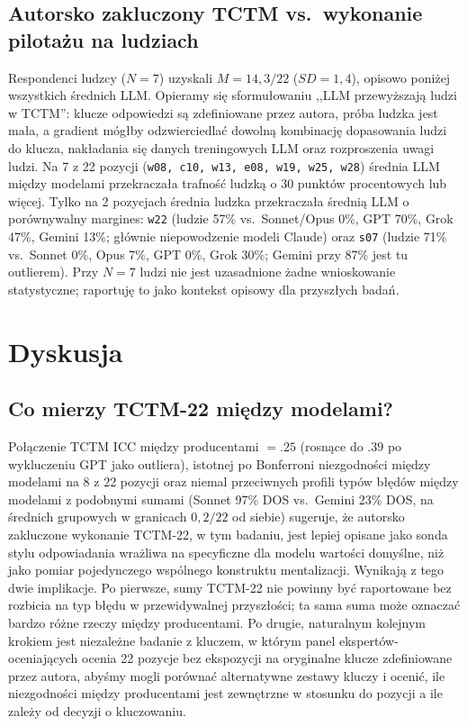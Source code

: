\documentclass[11pt,a4paper]{article}
\begin{document}
\subsection{Autorsko zakluczony TCTM vs.\ wykonanie pilotażu na ludziach}

Respondenci ludzcy ($N = 7$) uzyskali $M = 14{,}3 / 22$ ($SD = 1{,}4$), opisowo poniżej wszystkich średnich LLM. Opieramy się sformułowaniu ,,LLM przewyższają ludzi w TCTM'': klucze odpowiedzi są zdefiniowane przez autora, próba ludzka jest mała, a gradient mógłby odzwierciedlać dowolną kombinację dopasowania ludzi do klucza, nakładania się danych treningowych LLM oraz rozproszenia uwagi ludzi. Na 7 z 22 pozycji (\texttt{w08, c10, w13, e08, w19, w25, w28}) średnia LLM między modelami przekraczała trafność ludzką o 30 punktów procentowych lub więcej. Tylko na 2 pozycjach średnia ludzka przekraczała średnią LLM o porównywalny margines: \texttt{w22} (ludzie 57\% vs.\ Sonnet/Opus 0\%, GPT 70\%, Grok 47\%, Gemini 13\%; głównie niepowodzenie modeli Claude) oraz \texttt{s07} (ludzie 71\% vs.\ Sonnet 0\%, Opus 7\%, GPT 0\%, Grok 30\%; Gemini przy 87\% jest tu outlierem). Przy $N = 7$ ludzi nie jest uzasadnione żadne wnioskowanie statystyczne; raportuję to jako kontekst opisowy dla przyszłych badań.

\section{Dyskusja}

\subsection{Co mierzy TCTM-22 między modelami?}

Połączenie TCTM ICC między producentami $= .25$ (rosnące do $.39$ po wykluczeniu GPT jako outliera), istotnej po Bonferroni niezgodności między modelami na 8 z 22 pozycji oraz niemal przeciwnych profili typów błędów między modelami z podobnymi sumami (Sonnet 97\% DOS vs.\ Gemini 23\% DOS, na średnich grupowych w granicach $0{,}2 / 22$ od siebie) sugeruje, że autorsko zakluczone wykonanie TCTM-22, w tym badaniu, jest lepiej opisane jako sonda stylu odpowiadania wrażliwa na specyficzne dla modelu wartości domyślne, niż jako pomiar pojedynczego wspólnego konstruktu mentalizacji. Wynikają z tego dwie implikacje. Po pierwsze, sumy TCTM-22 nie powinny być raportowane bez rozbicia na typ błędu w przewidywalnej przyszłości; ta sama suma może oznaczać bardzo różne rzeczy między producentami. Po drugie, naturalnym kolejnym krokiem jest niezależne badanie z kluczem, w którym panel ekspertów-oceniających ocenia 22 pozycje bez ekspozycji na oryginalne klucze zdefiniowane przez autora, abyśmy mogli porównać alternatywne zestawy kluczy i ocenić, ile niezgodności między producentami jest zewnętrzne w stosunku do pozycji a ile zależy od decyzji o kluczowaniu.
\end{document}
